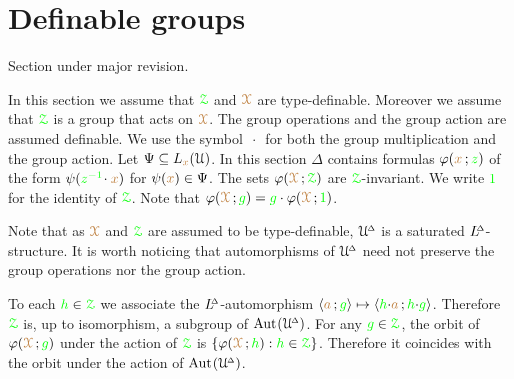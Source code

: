 \section{Definable groups}\label{definablegroups}

\def\medrel#1{\parbox[t]{5ex}{$\displaystyle\hfil #1$}}
\def\ceq#1#2#3{\parbox[t]{25ex}{$\displaystyle #1$}\medrel{#2}{$\displaystyle #3$}}

\noindent\llap{\textcolor{red}{\Large\warning}\kern1.5ex}\ignorespaces
Section under major revision.

In this section we assume that $\grZ$ and $\mrX$ are type-definable.
Moreover we assume that $\grZ$ is a group that acts on $\mrX$.
The group operations and the group action are assumed definable.
We use the symbol $\,\cdot\,$ for both the group multiplication and the group action.
Let $\Psi\subseteq L_{\mr x}(\U)$.
In this section $\Delta$ contains formulas $\phi({\mr x}\,;{\gr z})$ of the form  $\psi({\gr z^{-1}}\!\cdot{\mr x})$ for $\psi({\mr x})\in\Psi$.
The sets $\phi(\mrX\,;\grZ)$ are $\grZ$-invariant.
We write ${\gr 1}$ for the identity of $\grZ$.
Note that $\phi(\mrX\,;{\gr g})={\gr g}\cdot\phi(\mrX\,;{\gr 1})$.

Note that as $\mrX$ and $\grZ$ are assumed to be type-definable, $\UDelta$ is a saturated $\LDelta$-structure.
It is worth noticing that automorphisms of $\UDelta$ need not preserve the group operations nor the group action.

To each ${\gr h}\in\grZ$ we associate the $\LDelta$-automorphism $\<{\mr a}\,;{\gr g}\>\mapsto\<{\gr h}{\cdot}{\mr a}\,;{\gr h}{\cdot}{\gr g}\>$.
Therefore $\grZ$ is, up to isomorphism, a subgroup of $\Aut(\UDelta)$.
For any ${\gr g}\in\grZ$, the orbit of $\phi(\mrX\,;{\gr g})$ under the action of $\grZ$ is $\{\phi(\mrX\,;{\gr h}) : {\gr h}\in\grZ\}$.
Therefore it coincides with the orbit under the action of $\Aut(\UDelta)$.



